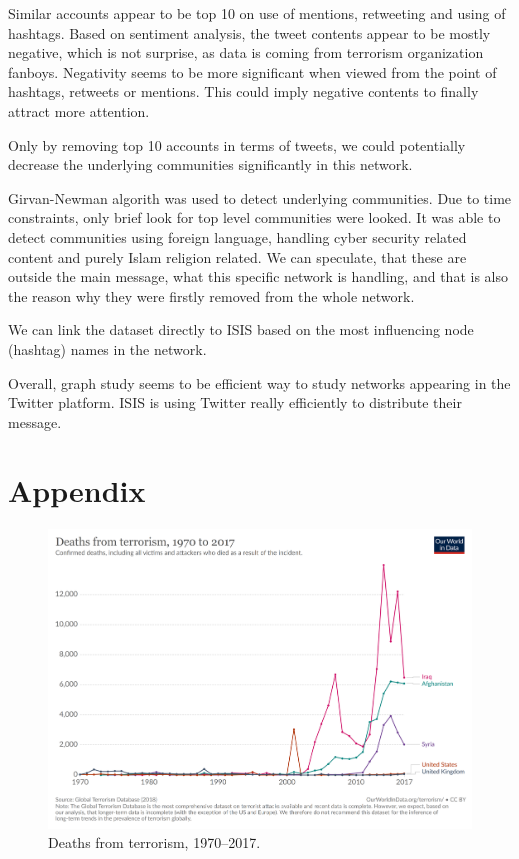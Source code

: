 \documentclass[conference]{IEEEtran}
\begin{document}
    Similar accounts appear to be top 10 on use of mentions, retweeting and using of hashtags.
    Based on sentiment analysis, the tweet contents appear to be mostly negative, which is not surprise, as data is coming from terrorism organization fanboys.
    Negativity seems to be more significant when viewed from the point of hashtags, retweets or mentions.
    This could imply negative contents to finally attract more attention.

    Only by removing top 10 accounts in terms of tweets, we could potentially decrease the underlying communities significantly in this network.

    Girvan-Newman algorith was used to detect underlying communities.
    Due to time constraints, only brief look for top level communities were looked.
    It was able to detect communities using foreign language, handling cyber security related content and purely Islam religion related.
    We can speculate, that these are outside the main message, what this specific network is handling, and that is also the reason why they were firstly removed from the whole network.

    We can link the dataset directly to ISIS based on the most influencing node (hashtag) names in the network.

    Overall, graph study seems to be efficient way to study networks appearing in the Twitter platform.
    ISIS is using Twitter really efficiently to distribute their message.


    
    

    \newpage
    \section*{Appendix}

    \begin{figure}
        \includegraphics[scale=0.15]{figures/fatalities-from-terrorism}
        \caption{Deaths from terrorism, 1970--2017.}
        \label{fig:appendix_terrorism_deaths}
    \end{figure}\label{subsec:data-verification-after-some-pre-processing-methods}
\end{document}
